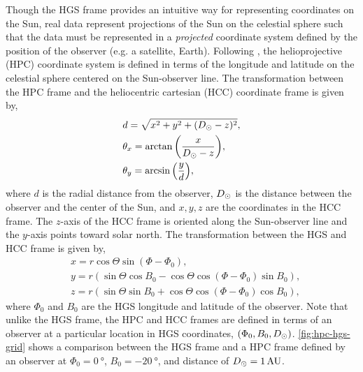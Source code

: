 Though the HGS frame provides an intuitive way for representing coordinates on the Sun, real data represent projections of the Sun on the celestial sphere such that the data must be represented in a \textit{projected} coordinate system defined by the position of the observer (e.g. a satellite, Earth). Following \citet{thompson_coordinate_2006}, the helioprojective (HPC) coordinate system is defined in terms of the longitude and latitude on the celestial sphere centered on the Sun-observer line. The transformation between the HPC frame and the heliocentric cartesian (HCC) coordinate frame is given by,
\begin{align}\label{eq:hcc_hpc_transform}
    &d = \sqrt{x^2 + y^2  + (D_{\odot} - z)^2}, \\
    &\theta_x = \arctan{\left(\frac{x}{D_{\odot} - z}\right)}, \\
    &\theta_y = \arcsin{\left(\frac{y}{d}\right)},
\end{align}
where $d$ is the radial distance from the observer, $D_{\odot}$ is the distance between the observer and the center of the Sun, and $x,y,z$ are the coordinates in the HCC frame. The $z$-axis of the HCC frame is oriented along the Sun-observer line and the $y$-axis points toward solar north. The transformation between the HGS and HCC frame is given by,
\begin{align}\label{eq:hgs_hcc_transform}
    &x = r\cos{\Theta}\sin{(\Phi - \Phi_0)}, \\
    &y = r\left( \sin{\Theta}\cos{B_0} - \cos{\Theta}\cos{(\Phi - \Phi_0)}\sin{B_0} \right), \\
    &z = r\left( \sin{\Theta}\sin{B_0} + \cos{\Theta}\cos{(\Phi - \Phi_0)}\cos{B_0} \right),
\end{align}
where $\Phi_0$ and $B_0$ are the HGS longitude and latitude of the observer. Note that unlike the HGS frame, the HPC and HCC frames are defined in terms of an observer at a particular location in HGS coordinates, $(\Phi_0, B_0, D_{\odot})$. \autoref{fig:hpc-hgs-grid} shows a comparison between the HGS frame and a HPC frame defined by an observer at $\Phi_0=\SI{0}{\degree}$, $B_0=\SI{-20}{\degree}$, and distance of $D_{\odot}=1\,\textup{AU}$.


